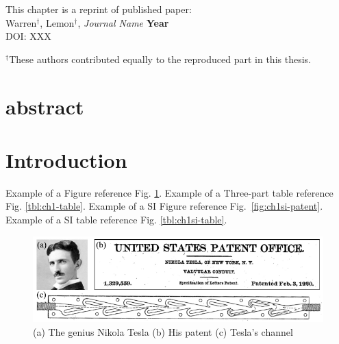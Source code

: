 
This chapter is a reprint of published paper: \\
Warren$^{\dagger}$, Lemon$^{\dagger}$, \textit{Journal Name} \textbf{Year} \\ %
DOI: XXX

$^{\dagger}$These authors contributed equally to the reproduced part in this thesis.


\section*{abstract}
\lipsum[1]



\section{Introduction}
\lipsum[2]

Example of a Figure reference Fig. \ref{fig:ch1-patent}. 
Example of a Three-part table reference Fig. \ref{tbl:ch1-table}. 
Example of a SI Figure reference Fig.~\ref{fig:ch1si-patent}.
Example of a SI table reference Fig. \ref{tbl:ch1si-table}.


\begin{figure}
\centering
\includegraphics[width=16.5cm]{figures/ch_chapter1/fig1.pdf}\vspace{-0.2cm}
\caption{(a) The genius Nikola Tesla (b) His patent (c) Tesla's channel }
\label{fig:ch1-patent}
\end{figure}


